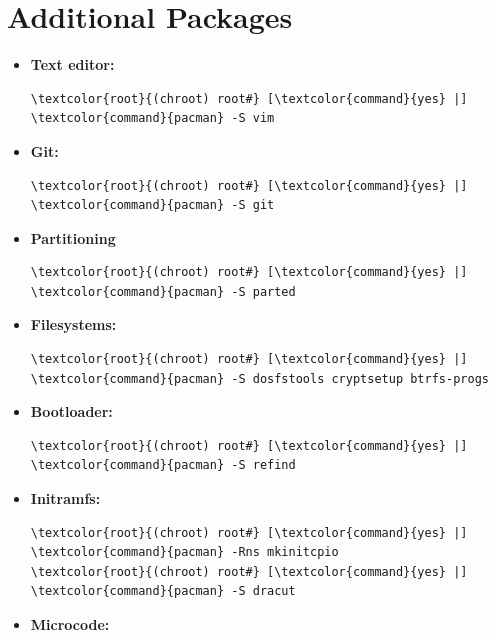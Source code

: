 \documentclass[10pt, a4paper, onecolumn, oneside, titlepage, openany]{book}
\begin{document}
\section{Additional Packages}
\begin{itemize}
    \item \textbf{Text editor:}
\begin{Verbatim}[commandchars=\\\{\}]
\textcolor{root}{(chroot) root#} [\textcolor{command}{yes} |] \textcolor{command}{pacman} -S vim
\end{Verbatim}
    \item \textbf{Git:}
\begin{Verbatim}[commandchars=\\\{\}]
\textcolor{root}{(chroot) root#} [\textcolor{command}{yes} |] \textcolor{command}{pacman} -S git
\end{Verbatim}
    \item \textbf{Partitioning}
\begin{Verbatim}[commandchars=\\\{\}]
\textcolor{root}{(chroot) root#} [\textcolor{command}{yes} |] \textcolor{command}{pacman} -S parted
\end{Verbatim}
    \item \textbf{Filesystems:}
\begin{Verbatim}[commandchars=\\\{\}]
\textcolor{root}{(chroot) root#} [\textcolor{command}{yes} |] \textcolor{command}{pacman} -S dosfstools cryptsetup btrfs-progs
\end{Verbatim}
    \item \textbf{Bootloader:}
\begin{Verbatim}[commandchars=\\\{\}]
\textcolor{root}{(chroot) root#} [\textcolor{command}{yes} |] \textcolor{command}{pacman} -S refind
\end{Verbatim}
     \item \textbf{Initramfs:}
\begin{Verbatim}[commandchars=\\\{\}]
\textcolor{root}{(chroot) root#} [\textcolor{command}{yes} |] \textcolor{command}{pacman} -Rns mkinitcpio
\textcolor{root}{(chroot) root#} [\textcolor{command}{yes} |] \textcolor{command}{pacman} -S dracut
\end{Verbatim}
    \item \textbf{Microcode:}
\begin{Verbatim}[commandchars=\\\{\}]

\end{Verbatim}
\end{itemize}
\end{document}
